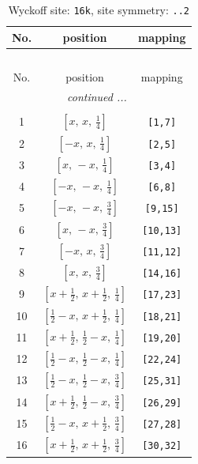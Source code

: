 \documentclass[fleqn,8pt]{jsarticle}
\begin{document}
\renewcommand{\arraystretch}{1.2}
\begin{longtable}{ccc}
\caption{Wyckoff site: {\tt 16k}, site symmetry: {\tt ..2}}
 \\
 \hline \hline
No. & position & mapping \\ \hline \endfirsthead

\multicolumn{2}{l}{\tablename\ \thetable{}} \\
 \hline \hline
No. & position & mapping \\ \hline \endhead

 \hline \hline
\multicolumn{2}{r}{\footnotesize\it continued ...} \\ \endfoot

 \hline \hline
\multicolumn{2}{r}{} \\ \endlastfoot

1 & $\left[ x,\, x,\, \frac{1}{4} \right]$ & {\tt [1,7]} \\ \hline
2 & $\left[ - x,\, x,\, \frac{1}{4} \right]$ & {\tt [2,5]} \\ \hline
3 & $\left[ x,\, - x,\, \frac{1}{4} \right]$ & {\tt [3,4]} \\ \hline
4 & $\left[ - x,\, - x,\, \frac{1}{4} \right]$ & {\tt [6,8]} \\ \hline
5 & $\left[ - x,\, - x,\, \frac{3}{4} \right]$ & {\tt [9,15]} \\ \hline
6 & $\left[ x,\, - x,\, \frac{3}{4} \right]$ & {\tt [10,13]} \\ \hline
7 & $\left[ - x,\, x,\, \frac{3}{4} \right]$ & {\tt [11,12]} \\ \hline
8 & $\left[ x,\, x,\, \frac{3}{4} \right]$ & {\tt [14,16]} \\ \hline
9 & $\left[ x + \frac{1}{2},\, x + \frac{1}{2},\, \frac{1}{4} \right]$ & {\tt [17,23]} \\ \hline
10 & $\left[ \frac{1}{2} - x,\, x + \frac{1}{2},\, \frac{1}{4} \right]$ & {\tt [18,21]} \\ \hline
11 & $\left[ x + \frac{1}{2},\, \frac{1}{2} - x,\, \frac{1}{4} \right]$ & {\tt [19,20]} \\ \hline
12 & $\left[ \frac{1}{2} - x,\, \frac{1}{2} - x,\, \frac{1}{4} \right]$ & {\tt [22,24]} \\ \hline
13 & $\left[ \frac{1}{2} - x,\, \frac{1}{2} - x,\, \frac{3}{4} \right]$ & {\tt [25,31]} \\ \hline
14 & $\left[ x + \frac{1}{2},\, \frac{1}{2} - x,\, \frac{3}{4} \right]$ & {\tt [26,29]} \\ \hline
15 & $\left[ \frac{1}{2} - x,\, x + \frac{1}{2},\, \frac{3}{4} \right]$ & {\tt [27,28]} \\ \hline
16 & $\left[ x + \frac{1}{2},\, x + \frac{1}{2},\, \frac{3}{4} \right]$ & {\tt [30,32]} \\
\end{longtable}
\end{document}
